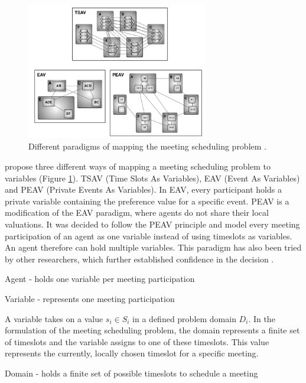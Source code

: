 \begin{figure}[h!]
\includegraphics[width=300px]{graphics/variablemodell.png}
\caption{Different paradigms of mapping the meeting scheduling problem \cite{Maheswarana}.}
\label{fig:variablemapping}
\end{figure}
\cite{Maheswarana} propose three different ways of mapping a meeting scheduling problem to variables (Figure \ref{fig:variablemapping}). TSAV (Time Slots As Variables), EAV (Event As Variables) and PEAV (Private Events As Variables). In EAV, every participant holds a private variable containing the preference value for a specific event. PEAV is a modification of the EAV paradigm, where agents do not share their local valuations. It was decided to follow the PEAV principle and model every meeting participation of an agent as one variable instead of using timeslots as variables. An agent therefore can hold multiple variables. This paradigm has also been tried by other researchers, which further established confidence in the decision \cite{Petcu2003}.
\begin{hardconstraint2}
Agent - holds one variable per meeting participation
\end{hardconstraint2}
\begin{hardconstraint2}
Variable - represents one meeting participation
\end{hardconstraint2}
A variable takes on a value \(s_{i} \in S_{i}\) in a defined problem domain \(D_{i}\). In the formulation of the meeting scheduling problem, the domain represents a finite set of timeslots and the variable assigns to one of these timeslots. This value represents the currently, locally chosen timeslot for a specific meeting.
\begin{hardconstraint2}
Domain - holds a finite set of possible timeslots to schedule a meeting
\end{hardconstraint2}
